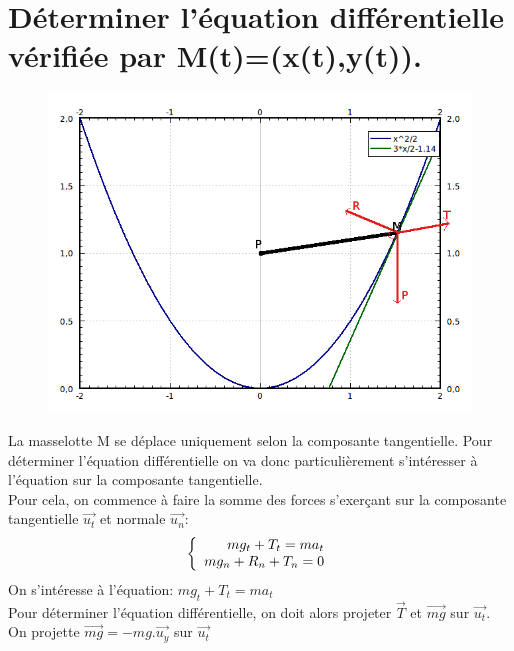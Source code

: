 \documentclass[10pt,a4paper]{article}
\begin{document}
\section{Déterminer l'équation différentielle vérifiée par M(t)=(x(t),y(t)).}
\begin{figure}[H]
	\includegraphics[scale=0.7]{GraphMath2.png}
\end{figure}
La masselotte M se déplace uniquement selon la composante tangentielle. Pour déterminer l'équation différentielle on va donc particulièrement s'intéresser à l'équation sur la composante tangentielle.\\
Pour cela, on commence à faire la somme des forces s'exerçant sur la composante tangentielle $\vec{u_t}$ et normale $\vec{u_n}$:
\[
   \left \{
   \begin{array}{r c l}
      mg_t+T_t=ma_t  \\
      mg_n+R_n+T_n=0 
   \end{array}
   \right .
\]
On s'intéresse à l'équation: $mg_t+T_t=ma_t$ \\ 
Pour déterminer l'équation différentielle, on doit alors projeter $\vec{T}$ et  $\vec{mg}$ sur $\vec{u_t}$. \\
On projette $\vec{mg}=-mg.\vec{u_y}$ sur $\vec{u_t}$\\
\end{document}
